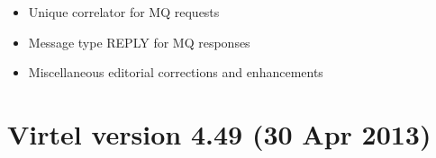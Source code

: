 \documentclass[letterpaper,10pt,english]{sphinxmanual}
\begin{document}
\sphinxAtStartPar
{}
\begin{itemize}
\item {} 
\sphinxAtStartPar
Unique correlator for MQ requests

\item {} 
\sphinxAtStartPar
Message type REPLY for MQ responses

\end{itemize}

\sphinxAtStartPar
{}
\begin{itemize}
\item {} 
\sphinxAtStartPar
Miscellaneous editorial corrections and enhancements

\end{itemize}


\section{Virtel version 4.49 (30 Apr 2013)}
\label{\detokenize{Installation_Guide:virtel-version-4-49-30-apr-2013}}
\sphinxAtStartPar
{}
\end{document}
